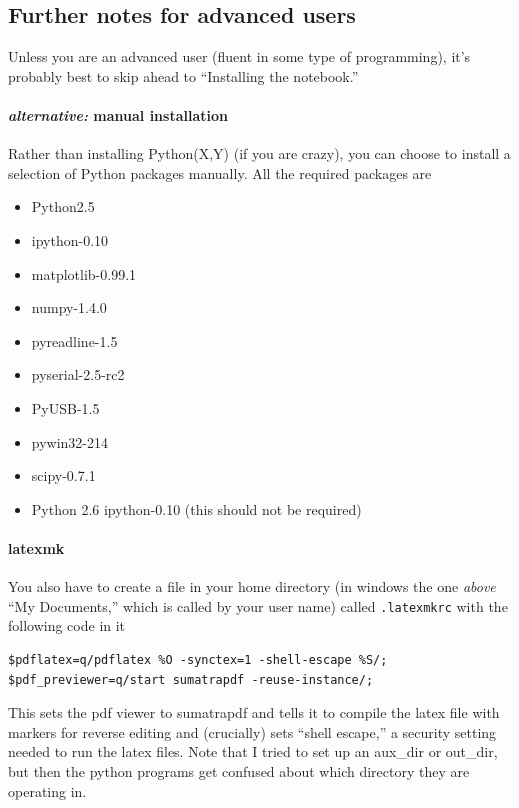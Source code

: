 \subsection{Further notes for advanced users}
Unless you are an advanced user (fluent in some type of programming),
    it's probably best to skip ahead
    to ``Installing the notebook.''
\paragraph{\textit{alternative:} manual installation}
Rather than installing Python(X,Y) (if you are crazy),
    you can choose to install a selection of Python packages manually.
All the required packages are
\begin{itemize}
    \item Python2.5
    \item ipython-0.10
    \item matplotlib-0.99.1
    \item numpy-1.4.0
    \item pyreadline-1.5
    \item pyserial-2.5-rc2
    \item PyUSB-1.5
    \item pywin32-214
    \item scipy-0.7.1
    \item Python 2.6 ipython-0.10 (this should not be required)
\end{itemize}
    \paragraph{latexmk}
You also have to create a file in your home directory (in windows the one \textit{above} ``My Documents,'' which is called by your user name) called \texttt{.latexmkrc} with the following code in it
\begin{verbatim}
$pdflatex=q/pdflatex %O -synctex=1 -shell-escape %S/;
$pdf_previewer=q/start sumatrapdf -reuse-instance/;
\end{verbatim}
This sets the pdf viewer to sumatrapdf and tells it to compile the latex file
    with markers for reverse editing and (crucially) sets ``shell escape,''
    a security setting needed to run the latex files.
Note that I tried to set up an aux\_dir or out\_dir,
    but then the python programs get confused about which directory
    they are operating in.

